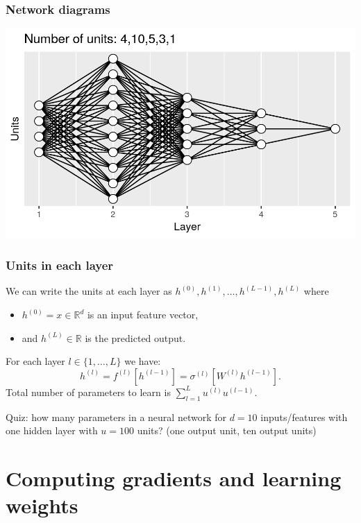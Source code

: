\documentclass{beamer}
\begin{document}
\begin{frame}
  \frametitle{Network diagrams}

\includegraphics[width=\textwidth]{figure-architecture-fiveLayers}
\end{frame}

\begin{frame}
  \frametitle{Units in each layer}
We can write the units at each layer as
$h^{(0)},h^{(1)},\dots, h^{(L-1)}, h^{(L)}$ where
\begin{itemize}
\item $h^{(0)}=x\in\mathbb R^d$ is an input feature vector,
\item and
$h^{(L)}\in\mathbb R$ is the predicted output.
\end{itemize}
For
each layer $l\in \{1, \dots, L\}$ we have:
\begin{equation*}
  \label{eq:h_l}
  h^{(l)} = f^{(l)}\left[h^{(l-1)}\right] =
  \sigma^{(l)}\left[ W^{(l)} h^{(l-1)} \right].
\end{equation*}
Total number of parameters to learn is
$\sum_{l=1}^L u^{(l)} u^{(l-1)}.$

Quiz: how many parameters in a
neural network for $d=10$ inputs/features with one hidden layer with
$u=100$ units? (one output unit, ten output units)
\end{frame}

\section{Computing gradients and learning weights}
\end{document}
